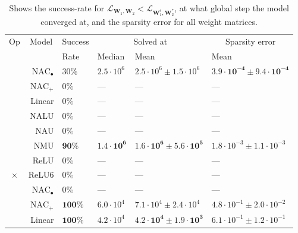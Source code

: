 \begin{table}[H]

\caption{\label{tab:function-task-static-defaults-all}Shows the success-rate for $\mathcal{L}_{\mathbf{W}_1, \mathbf{W}_2} < \mathcal{L}_{\mathbf{W}_1^\epsilon, \mathbf{W}_2^*}$, at what global step the model converged at, and the sparsity error for all weight matrices.}
\centering
\begin{tabular}{crllll}
\toprule
\multicolumn{1}{c}{Op} & \multicolumn{1}{c}{Model} & \multicolumn{1}{c}{Success} & \multicolumn{2}{c}{Solved at} & \multicolumn{1}{c}{Sparsity error} \\
\cmidrule(l{3pt}r{3pt}){1-1} \cmidrule(l{3pt}r{3pt}){2-2} \cmidrule(l{3pt}r{3pt}){3-3} \cmidrule(l{3pt}r{3pt}){4-5} \cmidrule(l{3pt}r{3pt}){6-6}
 &  & Rate & Median & Mean & Mean\\
\midrule
 & $\mathrm{NAC}_{\bullet}$ & $30\%$ & $2.5 \cdot 10^{6}$ & $2.5 \cdot 10^{6} \pm 1.5 \cdot 10^{6}$ & $\mathbf{3.9 \cdot 10^{-4} \pm 9.4 \cdot 10^{-4}}$\\

 & $\mathrm{NAC}_{+}$ & $0\%$ & --- & --- & ---\\

 & Linear & $0\%$ & --- & --- & ---\\

 & NALU & $0\%$ & --- & --- & ---\\

 & NAU & $0\%$ & --- & --- & ---\\

 & NMU & $\mathbf{90\%}$ & $\mathbf{1.4 \cdot 10^{6}}$ & $\mathbf{1.6 \cdot 10^{6} \pm 5.6 \cdot 10^{5}}$ & $1.8 \cdot 10^{-3} \pm 1.1 \cdot 10^{-3}$\\

 & ReLU & $0\%$ & --- & --- & ---\\

\multirow{-8}{*}{\centering\arraybackslash $\bm{\times}$} & ReLU6 & $0\%$ & --- & --- & ---\\
\cmidrule{1-6}
 & $\mathrm{NAC}_{\bullet}$ & $0\%$ & --- & --- & ---\\

 & $\mathrm{NAC}_{+}$ & $\mathbf{100\%}$ & $6.0 \cdot 10^{4}$ & $7.1 \cdot 10^{4} \pm 2.4 \cdot 10^{4}$ & $4.8 \cdot 10^{-1} \pm 2.0 \cdot 10^{-2}$\\

 & Linear & $\mathbf{100\%}$ & $4.2 \cdot 10^{4}$ & $\mathbf{4.2 \cdot 10^{4} \pm 1.9 \cdot 10^{3}}$ & $6.1 \cdot 10^{-1} \pm 1.2 \cdot 10^{-1}$\\


\end{tabular}
\end{table}
